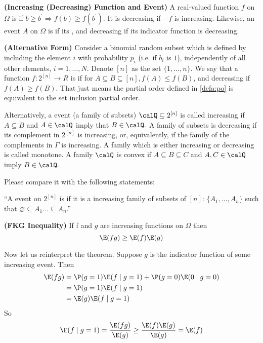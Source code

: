 \documentclass{article}
\newcommand{\bfs}[1]{\textbf{({#1})}}
\begin{document}
\begin{defa}{\bfs{Increasing (Decreasing) Function and Event}}
A real-valued function $f$ on $\Omega$ is  if $b \geq b^{\prime} \Rightarrow f(b) \geq f\left(b^{\prime}\right) .$ It is decreasing if $-f$ is increasing. Likewise, an event $A$ on $\Omega$ is  if its , and decreasing if its indicator function is decreasing.
\end{defa} 
\begin{rema}{\bfs{Alternative Form}}
Consider a binomial random subset which is defined by including the element $i$ with probability $p_{i}$ (i.e. if $b_i$ is $1$), independently of all other elements, $i=1, \ldots, N$. Denote $[n]$ as the set $\{1,\ldots,n\}$. We say that a function $f: 2^{[n]} \rightarrow R$ is  if for $A \subseteq B\subseteq [n], f(A) \leq f(B)$, and decreasing if $f(A) \geq f(B)$. That just means the partial order defined in \cref{defa:po} is equivalent to the set inclusion partial order.  

Alternatively, a event (a family of subsets) $\calQ \subseteq 2^{[n]}$ is called increasing if $A \subseteq B$ and $A \in \calQ$ imply that $B \in \calQ .$ A family of subsets is decreasing if its complement in $2^{[n]}$ is increasing, or, equivalently, if the family of the complements in $\Gamma$ is increasing. A family which is either increasing or decreasing is called monotone. A family $\calQ$ is convex if $A \subseteq B \subseteq C$ and $A, C \in \calQ$ imply $B \in \calQ .$

Please compare it with the following \blue{[WRONG]} statements:

``A event on $2^{[n]}$ is  if it is a increasing family of subsets of $[n]$: $\{A_1,\ldots, A_n\}$ such that $\varnothing\subseteq A_1\ldots\subseteq A_n$.''


\end{rema}
\begin{thma}{\bfs{FKG Inequality}}
If f and $g$ are increasing functions on $\Omega$ then
$$
\E(f g) \geq \E(f) \E(g)
$$
\end{thma}



\begin{rema}
Now let us reinterpret the theorem. Suppose $g$ is the indicator function of some increasing event. Then
\begin{align*}
    \E(f g)&=\P(g=1) \E(f\mid g=1)+\P(g=0) \E(0 \mid g=0)\\
    &=\P(g=1) \E(f \mid g=1)\\
    &=\E(g) \E(f \mid g=1)
\end{align*}
So
$$
\E(f \mid g=1)=\frac{\E(f g)}{\E(g)} \geq \frac{\E(f) \E(g)}{\E(g)}=\E(f)
$$
\end{rema}
\end{document}
